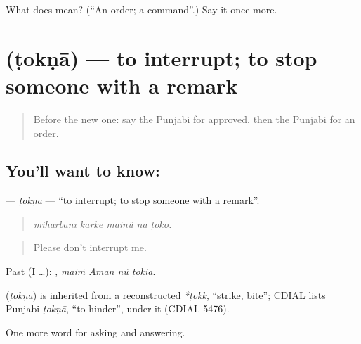 \begin{tcolorbox}[breakable,colback=teal!4,colframe=teal!35!black,title={Before you move on}]
What does  mean? (\textquotedblleft{}An order; a command\textquotedblright{}.) Say it once more.
\end{tcolorbox}
\section[\texorpdfstring{\pa{ਟੋਕਣਾ} (ṭokṇā)}{ਟੋਕਣਾ (ṭokṇā)}]{ (ṭokṇā) — to interrupt; to stop someone with a remark}

\label{lesson:PA-C338-tokna}



\begin{quote}
Before the new one: say the Punjabi for approved, then the Punjabi for an order.
\end{quote}

\subsection*{You'll want to know: }
\textbf{} — \emph{ṭokṇā} — \textquotedblleft{}to interrupt; to stop someone with a remark\textquotedblright{}.

\begin{quote}
    
\end{quote}

\begin{quote}
\emph{miharbānī karke mainū̃ nā ṭoko.}
\end{quote}

\begin{quote}
Please don't interrupt me.
\end{quote}

Past (I …):    , \emph{maiṁ Aman nū̃ ṭokiā}.

\begin{cousinweb}
\textbf{} (\emph{ṭokṇā}) is inherited from a reconstructed \emph{*ṭōkk}, \textquotedblleft{}strike, bite\textquotedblright{}; CDIAL lists Punjabi \emph{ṭokṇā}, \textquotedblleft{}to hinder\textquotedblright{}, under it (CDIAL 5476).
\end{cousinweb}

\begin{grammarlens}[title={What you've built}]
One more word for asking and answering.
\end{grammarlens}

